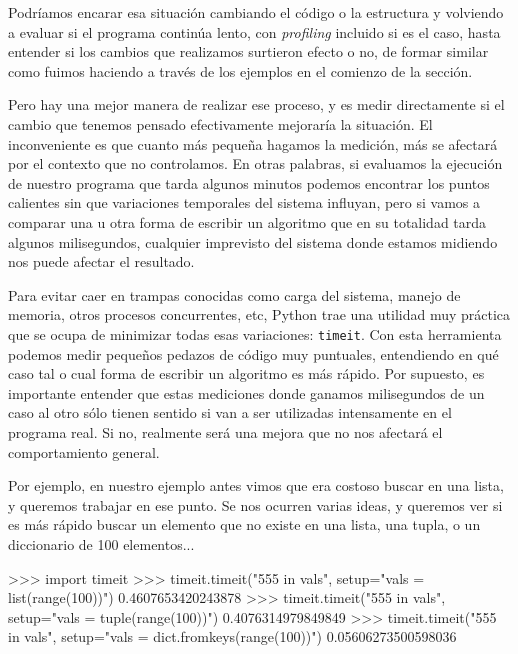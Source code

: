 Podríamos encarar esa situación cambiando el código o la estructura y volviendo a evaluar si el programa continúa lento, con \textit{profiling} incluido si es el caso, hasta entender si los cambios que realizamos surtieron efecto o no, de formar similar como fuimos haciendo a través de los ejemplos en el comienzo de la sección.

Pero hay una mejor manera de realizar ese proceso, y es medir directamente si el cambio que tenemos pensado efectivamente mejoraría la situación. El inconveniente es que cuanto más pequeña hagamos la medición, más se afectará por el contexto que no controlamos. En otras palabras, si evaluamos la ejecución de nuestro programa que tarda algunos minutos podemos encontrar los puntos calientes sin que variaciones temporales del sistema influyan, pero si vamos a comparar una u otra forma de escribir un algoritmo que en su totalidad tarda algunos milisegundos, cualquier imprevisto del sistema donde estamos midiendo nos puede afectar el resultado.

Para evitar caer en trampas conocidas como carga del sistema, manejo de memoria, otros procesos concurrentes, etc, Python trae una utilidad muy práctica que se ocupa de minimizar todas esas variaciones: \texttt{timeit}. Con esta herramienta podemos medir pequeños pedazos de código muy puntuales, entendiendo en qué caso tal o cual forma de escribir un algoritmo es más rápido. Por supuesto, es importante entender que estas mediciones donde ganamos milisegundos de un caso al otro sólo tienen sentido si van a ser utilizadas intensamente en el programa real. Si no, realmente será una mejora que no nos afectará el comportamiento general.

Por ejemplo, en nuestro ejemplo antes vimos que era costoso buscar en una lista, y queremos trabajar en ese punto. Se nos ocurren varias ideas, y queremos ver si es más rápido buscar un elemento que no existe en una lista, una tupla, o un diccionario de 100 elementos...

\begin{py}
>>> import timeit
>>> timeit.timeit("555 in vals", setup="vals = list(range(100))")
0.4607653420243878
>>> timeit.timeit("555 in vals", setup="vals = tuple(range(100))")
0.4076314979849849
>>> timeit.timeit("555 in vals", setup="vals = dict.fromkeys(range(100))")
0.05606273500598036
\end{py}

